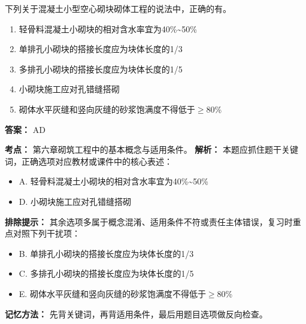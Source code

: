 \documentclass[UTF8,fontset=fandol,11pt]{ctexart}
\begin{document}
\begin{quizbox}[title={第 28 题}]
下列关于混凝土小型空心砌块砌体工程的说法中，正确的有。\\
\begin{enumerate}[label=\Alph*.]
\item 轻骨料混凝土小砌块的相对含水率宜为40\%\textasciitilde{}50\%
\item 单排孔小砌块的搭接长度应为块体长度的1/3
\item 多排孔小砌块的搭接长度应为块体长度的1/5
\item 小砌块施工应对孔错缝搭砌
\item 砌体水平灰缝和竖向灰缝的砂浆饱满度不得低于$\geq$80\%
\end{enumerate}
\textbf{答案：} AD
\vspace{0.25em}
\begin{answerbox}[title={考点解析}]
\textbf{考点：} 第六章砌筑工程中的基本概念与适用条件。
\textbf{解析：} 本题应抓住题干关键词，正确选项对应教材或课件中的核心表述：
\begin{itemize}
\item A. 轻骨料混凝土小砌块的相对含水率宜为40\%\textasciitilde{}50\%
\item D. 小砌块施工应对孔错缝搭砌
\end{itemize}
\textbf{排除提示：} 其余选项多属于概念混淆、适用条件不符或责任主体错误，复习时重点对照下列干扰项：
\begin{itemize}
\item B. 单排孔小砌块的搭接长度应为块体长度的1/3
\item C. 多排孔小砌块的搭接长度应为块体长度的1/5
\item E. 砌体水平灰缝和竖向灰缝的砂浆饱满度不得低于$\geq$80\%
\end{itemize}
\textbf{记忆方法：} 先背关键词，再背适用条件，最后用题目选项做反向检查。
\end{answerbox}
\end{quizbox}

\vspace{0.2em}
\end{document}
